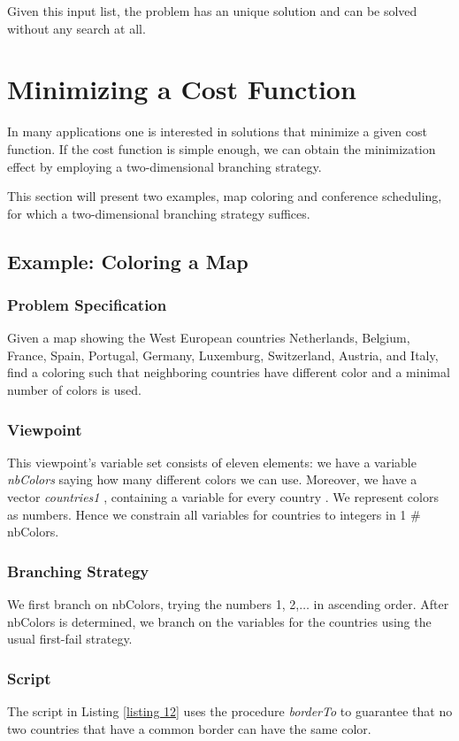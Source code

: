 \documentclass[a4paper,halfparskip]{scrartcl}
\begin{document}
Given this input list, the problem has an unique solution and can be solved
without any search at all.






\newpage
\section{Minimizing a Cost Function}
In many applications one is interested in solutions 
that minimize a given cost function. If the cost function 
is simple enough, we can obtain the minimization effect by 
employing a two-di\-men\-sio\-nal branching strategy.

This section will present two examples, map coloring and 
conference scheduling, for which a two-di\-men\-sio\-nal branching 
strategy suffices. 

\subsection{Example: Coloring a Map}
\subsubsection{Problem Specification}
Given a map showing the West European countries Netherlands, 
Belgium, France, Spain, Portugal, Germany, Luxemburg, Switzerland, 
Austria, and Italy, find a coloring such that neighboring 
countries have different color and a minimal number of colors is used. 

\subsubsection{Viewpoint}
This viewpoint's variable set consists of eleven elements:
we have a variable \emph{nbColors} saying how many different colors we can use. 
Moreover, we have a vector \emph{countries1 }, containing a variable for every country .
We represent colors as numbers. Hence we constrain all variables 
for countries to integers in 1 $\#$ nbColors. 

\subsubsection{Branching Strategy}
We first branch on nbColors, trying the numbers 1, 2,$\ldots$ in ascending order. 
After nbColors is determined, we branch on the variables for the 
countries using the usual first-fail strategy. 

\subsubsection{Script}
The script in Listing \ref{listing 12} uses the procedure \emph{borderTo}
to guarantee that no two countries that have a common border can
have the same color.
\end{document}
